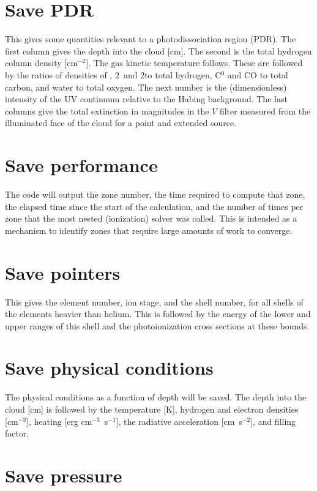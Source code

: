 \section{Save PDR}

This gives some quantities relevant to a photodissociation region (PDR).
The first column gives the depth into the cloud [cm].  The second is the
total hydrogen column density [cm$^{-2}$].  The gas kinetic temperature follows.
These are followed by the ratios of densities of \hO, 2\htwo\ and 2\htwo* to total
hydrogen, C$^0$ and CO to total carbon, and water to total oxygen.  The next
number is the (dimensionless) intensity of the UV continuum relative to
the Habing background. The last columns give the total extinction in
magnitudes in the $V$ filter measured from the illuminated face
of the cloud for a point and extended source.

\section{Save performance}

The code will output the zone number, the time required to compute that
zone, the elapsed time since the start of the calculation, and
the number of times per zone that the most nested (ionization) solver was called.
This is intended as a mechanism to identify zones that require large amounts of
work to converge. 

\section{Save pointers}

This gives the element number, ion stage, and the shell number, for all
shells of the elements heavier than helium.
This is followed by the energy
of the lower and upper ranges of this shell and the photoionization cross
sections at these bounds.

\section{Save physical conditions}

The physical conditions as a function of depth will be saved.  The
depth into the cloud [cm] is followed by the temperature [K], hydrogen and
electron densities [cm$^{-3}$], heating [erg cm$^{-3}$~s$^{-1}$], the radiative acceleration
[cm~s$^{-2}$], and filling factor.

\section{Save pressure}

